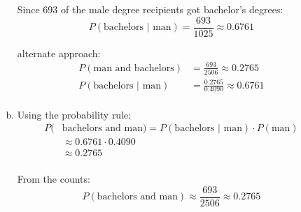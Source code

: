 \documentclass[letterpaper]{exam}
\begin{document}
\begin{description}
\begin{enumerate}[(a)]
          Since 693 of the male degree recipients got bachelor's degrees:
          \[
            P( \text{bachelors } | \text { man} ) = \frac{693}{1025} 
              \approx \boxed{ 0.6761 } 
          \]

          alternate approach:
          \begin{align*}
            P( \text{man and bachelors} )         & = \frac{693}{2506} \approx 0.2765 \\
            P( \text{bachelors } | \text { man} ) & = \frac{0.2765}{0.4090}
              \approx 0.6761 \\
          \end{align*}
        \item Using the probability rule:
          \begin{align*}
            P( & \text{bachelors and man}) = 
              P( \text{bachelors } | \text { man} ) \cdot P( \text{man} ) \\
              & \approx 0.6761 \cdot 0.4090  \\
              & \approx \boxed{ 0.2765 }  \\
          \end{align*}

          From the counts:
          \[
            P( \text{bachelors and man}) \approx \frac{693}{2506} \approx 0.2765 
          \]

      \end{enumerate}





\end{description}
\end{document}
